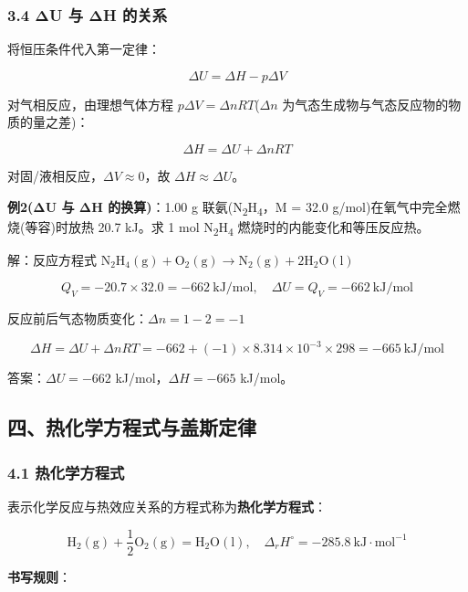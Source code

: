 \documentclass[a4paper,11pt]{ctexart}
\begin{document}
\subsubsection{3.4 ΔU 与 ΔH 的关系}\label{ux3b4u-ux4e0e-ux3b4h-ux7684ux5173ux7cfb}

将恒压条件代入第一定律：

\[
\Delta U = \Delta H - p\Delta V
\]

对气相反应，由理想气体方程 \(p\Delta V = \Delta nRT\)(\(\Delta n\) 为气态生成物与气态反应物的物质的量之差)：

\[
\boxed{\Delta H = \Delta U + \Delta nRT}
\]

对固/液相反应，\(\Delta V \approx 0\)，故 \(\Delta H \approx \Delta U\)。

\textbf{例2(ΔU 与 ΔH 的换算)}：1.00 g 联氨(N\textsubscript{2}H\textsubscript{4}，M = 32.0 g/mol)在氧气中完全燃烧(等容)时放热 20.7 kJ。求 1 mol N\textsubscript{2}H\textsubscript{4} 燃烧时的内能变化和等压反应热。

解：反应方程式 \(\mathrm{N_2H_4(g) + O_2(g) \to N_2(g) + 2H_2O(l)}\)

\[Q_V = -20.7 \times 32.0 = -662\ \mathrm{kJ/mol}, \quad \Delta U = Q_V = -662\ \mathrm{kJ/mol}\]

反应前后气态物质变化：\(\Delta n = 1 - 2 = -1\)

\[\Delta H = \Delta U + \Delta nRT = -662 + (-1) \times 8.314 \times 10^{-3} \times 298 = -665\ \mathrm{kJ/mol}\]

答案：\(\Delta U = -662\) kJ/mol，\(\Delta H = -665\) kJ/mol。

\subsection{四、热化学方程式与盖斯定律}\label{ux56dbux70edux5316ux5b66ux65b9ux7a0bux5f0fux4e0eux76d6ux65afux5b9aux5f8b}

\subsubsection{4.1 热化学方程式}\label{ux70edux5316ux5b66ux65b9ux7a0bux5f0f}

表示化学反应与热效应关系的方程式称为\textbf{热化学方程式}：

\[
\mathrm{H_2(g) + \frac{1}{2}O_2(g) = H_2O(l)}, \quad \Delta_r H^\circ = -285.8\ \mathrm{kJ \cdot mol^{-1}}
\]

\textbf{书写规则}：
\end{document}
